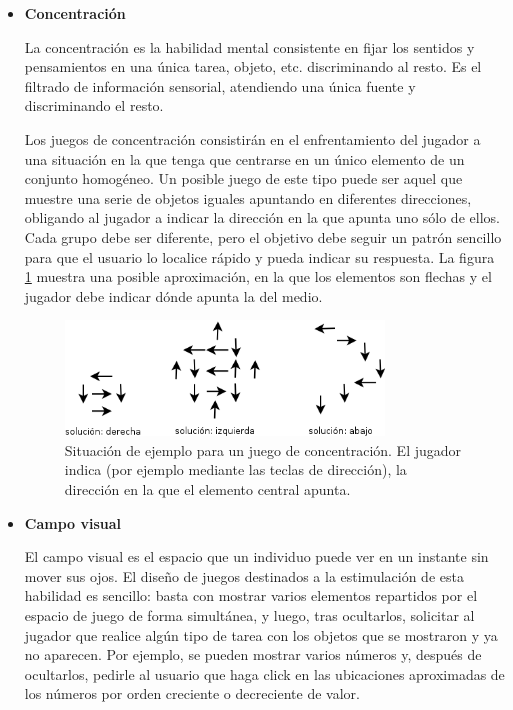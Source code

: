 \begin{itemize}

\item {\bf Concentración}

La concentración es la habilidad mental consistente en fijar los sentidos y pensamientos en una única tarea, objeto, etc. discriminando al resto. Es el filtrado de información sensorial, atendiendo una única fuente y discriminando el resto.

Los juegos de concentración consistirán en el enfrentamiento del jugador a una situación en la que tenga que centrarse en un único elemento de un conjunto homogéneo. Un posible juego de este tipo puede ser aquel que muestre una serie de objetos iguales apuntando en diferentes direcciones, obligando al jugador a indicar la dirección en la que apunta uno sólo de ellos. Cada grupo debe ser diferente, pero el objetivo debe seguir un patrón sencillo para que el usuario lo localice rápido y pueda indicar su respuesta. La figura \ref{fig::game-focus} muestra una posible aproximación, en la que los elementos son flechas y el jugador debe indicar dónde apunta la del medio.

\begin{figure}[h]
  \begin{center}
    \includegraphics[width=0.8\textwidth]{./images/game-focus.png}
    \caption{Situación de ejemplo para un juego de concentración. El jugador indica (por ejemplo mediante las teclas de dirección), la dirección en la que el elemento central apunta.}
    \label{fig::game-focus}
  \end{center}  
\end{figure}

\item {\bf Campo visual}

El campo visual es el espacio que un individuo puede ver en un instante sin mover sus ojos. El diseño de juegos destinados a la estimulación de esta habilidad es sencillo: basta con mostrar varios elementos repartidos por el espacio de juego de forma simultánea, y luego, tras ocultarlos, solicitar al jugador que realice algún tipo de tarea con los objetos que se mostraron y ya no aparecen. Por ejemplo, se pueden mostrar varios números y, después de ocultarlos, pedirle al usuario que haga click en las ubicaciones aproximadas de los números por orden creciente o decreciente de valor.

\end{itemize}

